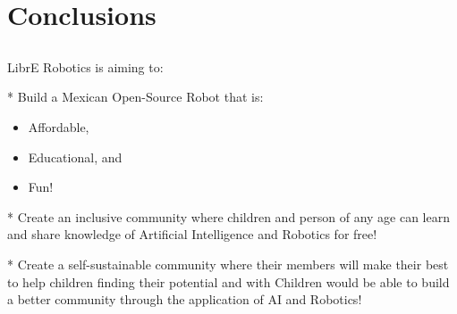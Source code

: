 \documentclass[compress]{beamer}
\begin{document}
\subsection{}






\section{Conclusions}

\subsection{}
{
\begin{frame}{LibrE Robotics is aiming to:}



* Build a Mexican Open-Source Robot that is:
\begin{itemize}
        \item Affordable, 
	\item Educational, and 
	\item Fun!
\end{itemize}

* Create an inclusive community where children and person of any age can
learn and share knowledge of Artificial Intelligence and
Robotics for free!


* Create a self-sustainable community where their
members will make their best to help 
children finding their potential and with Children 
would be able to build a better community through 
the application of AI and Robotics! 



\end{frame}
}


\section{}
\end{document}
